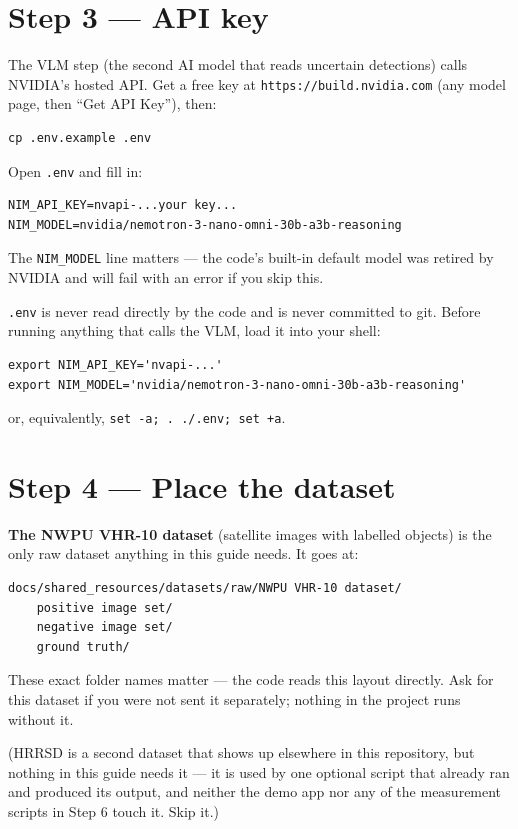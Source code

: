 \documentclass[11pt,a4paper]{article}
\begin{document}
\section{Step 3 --- API key}

The VLM step (the second AI model that reads uncertain detections) calls
NVIDIA's hosted API. Get a free key at
\texttt{https://build.nvidia.com} (any model page, then ``Get API Key''), then:

\begin{verbatim}
cp .env.example .env
\end{verbatim}

Open \texttt{.env} and fill in:

\begin{verbatim}
NIM_API_KEY=nvapi-...your key...
NIM_MODEL=nvidia/nemotron-3-nano-omni-30b-a3b-reasoning
\end{verbatim}

The \texttt{NIM\_MODEL} line matters --- the code's built-in default model
was retired by NVIDIA and will fail with an error if you skip this.

\texttt{.env} is never read directly by the code and is never committed to
git. Before running anything that calls the VLM, load it into your shell:

\begin{verbatim}
export NIM_API_KEY='nvapi-...'
export NIM_MODEL='nvidia/nemotron-3-nano-omni-30b-a3b-reasoning'
\end{verbatim}

or, equivalently, \texttt{set -a; . ./.env; set +a}.

\section{Step 4 --- Place the dataset}

\textbf{The NWPU VHR-10 dataset} (satellite images with labelled objects)
is the only raw dataset anything in this guide needs. It goes at:

\begin{verbatim}
docs/shared_resources/datasets/raw/NWPU VHR-10 dataset/
    positive image set/
    negative image set/
    ground truth/
\end{verbatim}

These exact folder names matter --- the code reads this layout directly.
Ask for this dataset if you were not sent it separately; nothing in the
project runs without it.

(HRRSD is a second dataset that shows up elsewhere in this repository, but
nothing in this guide needs it --- it is used by one optional script that
already ran and produced its output, and neither the demo app nor any of
the measurement scripts in Step 6 touch it. Skip it.)
\end{document}
